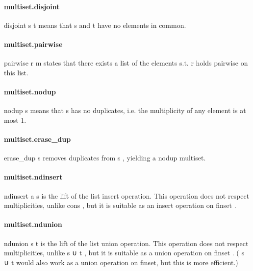 \documentclass{article}
\begin{document}
\paragraph{multiset.disjoint}
\par
\colorbox[RGB]{253,246,227}{{{{\color[RGB]{101, 123, 131} disjoint s t }}}} means that 
\colorbox[RGB]{253,246,227}{{{{\color[RGB]{101, 123, 131} s }}}} and 
\colorbox[RGB]{253,246,227}{{{{\color[RGB]{101, 123, 131} t }}}} have no elements in common.
\paragraph{multiset.pairwise}
\par
\colorbox[RGB]{253,246,227}{{{{\color[RGB]{101, 123, 131} pairwise r m }}}} states that there exists a list of the elements s.t. 
\colorbox[RGB]{253,246,227}{{{{\color[RGB]{101, 123, 131} r }}}} holds pairwise on this list.
\paragraph{multiset.nodup}
\par
\colorbox[RGB]{253,246,227}{{{{\color[RGB]{101, 123, 131} nodup s }}}} means that 
\colorbox[RGB]{253,246,227}{{{{\color[RGB]{101, 123, 131} s }}}} has no duplicates, i.e. the multiplicity of
any element is at most 1.
\paragraph{multiset.erase\_dup}
\par
\colorbox[RGB]{253,246,227}{{{{\color[RGB]{101, 123, 131} erase\_dup s }}}} removes duplicates from 
\colorbox[RGB]{253,246,227}{{{{\color[RGB]{101, 123, 131} s }}}}, yielding a 
\colorbox[RGB]{253,246,227}{{{{\color[RGB]{101, 123, 131} nodup }}}} multiset.
\paragraph{multiset.ndinsert}
\par
\colorbox[RGB]{253,246,227}{{{{\color[RGB]{101, 123, 131} ndinsert a s }}}} is the lift of the list 
\colorbox[RGB]{253,246,227}{{{{\color[RGB]{101, 123, 131} insert }}}} operation. This operation
does not respect multiplicities, unlike 
\colorbox[RGB]{253,246,227}{{{{\color[RGB]{101, 123, 131} cons }}}}, but it is suitable as
an insert operation on 
\colorbox[RGB]{253,246,227}{{{{\color[RGB]{101, 123, 131} finset }}}}.
\paragraph{multiset.ndunion}
\par
\colorbox[RGB]{253,246,227}{{{{\color[RGB]{101, 123, 131} ndunion s t }}}} is the lift of the list 
\colorbox[RGB]{253,246,227}{{{{\color[RGB]{101, 123, 131} union }}}} operation. This operation
does not respect multiplicities, unlike 
\colorbox[RGB]{253,246,227}{{{{\color[RGB]{101, 123, 131} s ∪ t }}}}, but it is suitable as
a union operation on 
\colorbox[RGB]{253,246,227}{{{{\color[RGB]{101, 123, 131} finset }}}}. (
\colorbox[RGB]{253,246,227}{{{{\color[RGB]{101, 123, 131} s ∪ t }}}} would also work as a union operation
on finset, but this is more efficient.)
\end{document}
